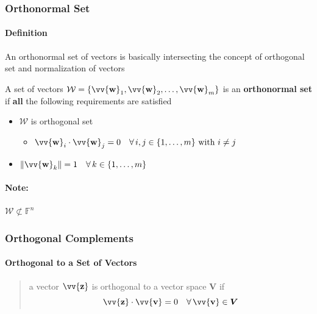 \documentclass[11pt]{article}
\DeclareRobustCommand{\myvec}[1]{\vv{\mathbf{#1}}}
\newcommand{\mysubvecsp}[1]{\bm{{#1}}}
\newcommand{\myset}[1]{\mathcal{#1}}
\begin{document}
    \subsubsection{Orthonormal Set}
    \paragraph{Definition}

    An orthonormal set of vectors is basically intersecting the concept of orthogonal set and normalization of vectors
    \vspace{1ex}

    A set of vectors $\myset{W} = \{\myvec{w}_1, \myvec{w}_2, \dots, \myvec{w}_m\}$ is an \textbf{orthonormal set} \\
    if \textbf{all} the following requirements are satisfied
    \begin{itemize}
        \item $\myset{W}$ is orthogonal set
        \begin{itemize}
            \item $\myvec{w}_i \cdot \myvec{w}_j = 0 \quad \forall\,i, j \in \{1, \dots, m\} \text{ with } i \neq j$
        \end{itemize}
        \item $\|\myvec{w}_k\| = 1 \quad \forall\,k \in \{1, \dots, m\}$
    \end{itemize}
    \paragraph{Note:} $\myset{W} \not\subset \mathbb{F}^n$

    
    \subsubsection{Orthogonal Complements}
    \paragraph{Orthogonal to a Set of Vectors}
    \begin{quote}
        a vector $\myvec{z}$ is orthogonal to a vector space $\mysubvecsp{V}$ if \\
        \[ \myvec{z} \cdot \myvec{v} = 0 \quad \forall\,\myvec{v} \in \mysubvecsp{V} \]
    \end{quote}
    
\end{document}
